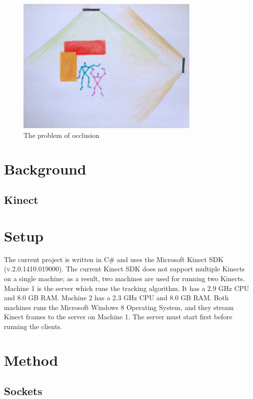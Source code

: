 \documentclass[paper=a4, fontsize=11pt]{scrartcl}
\numberwithin{equation}{section}		%
\numberwithin{figure}{section}			%
\numberwithin{table}{section}				%
\begin{document}
\begin{figure}
	\centering
	\includegraphics[width=0.8\textwidth]{occlusion_description}
	\caption{The problem of occlusion}
	\label{fig:occlusion_description}
\end{figure}

\section{Background}

\subsection{Kinect}

\section{Setup}

The current project is written in C\# and uses the Microsoft Kinect SDK (v.2.0.1410.019000). The current Kinect SDK does not support multiple Kinects on a single machine; as a result, two machines are used for running two Kinects. Machine 1 is the server which runs the tracking algorithm. It has a 2.9 GHz CPU and 8.0 GB RAM. Machine 2 has a 2.3 GHz CPU and 8.0 GB RAM. Both machines runs the Microsoft Windows 8 Operating System, and they stream Kinect frames to the server on Machine 1. The server must start first before running the clients.

\section{Method}

\subsection{Sockets}
\end{document}
